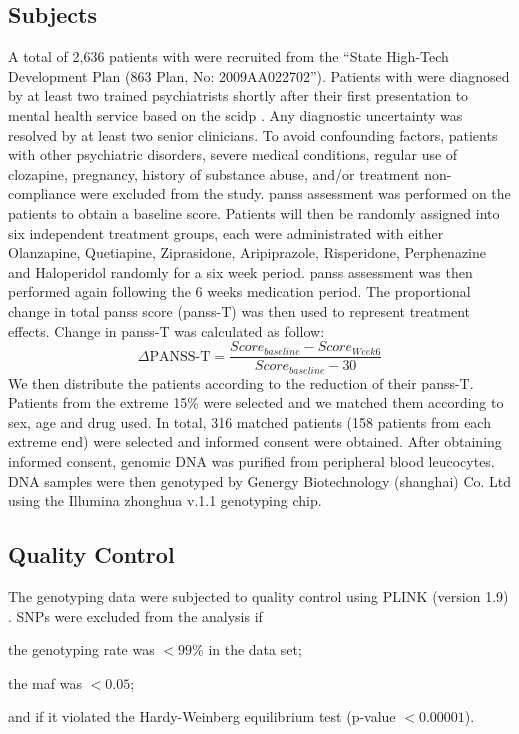 	\subsection{Subjects}
	A total of 2,636 patients with  were recruited from the ``State High-Tech Development Plan (863 Plan, No: 2009AA022702'').
	Patients with  were diagnosed by at least two trained psychiatrists shortly after their first presentation to mental health service based on the \gls{scidp} \citep{First2002}. 
	Any diagnostic uncertainty was resolved by at least two senior clinicians. 
	To avoid confounding factors, patients with other psychiatric disorders, severe medical conditions, regular use of clozapine, pregnancy, history of substance abuse, and/or treatment non-compliance were excluded from the study. 
	\gls{panss} assessment was performed on the patients to obtain a baseline score.
	Patients will then be randomly assigned into six independent treatment groups, each were administrated with either Olanzapine, Quetiapine, Ziprasidone, Aripiprazole, Risperidone, Perphenazine and Haloperidol randomly for a six week period.
	\gls{panss} assessment was then performed again following the 6 weeks medication period. 
	The proportional change in total \gls{panss} score (\gls{panss}-T) was then used to represent treatment effects.
	Change in \gls{panss}-T was calculated as follow:
	\begin{equation}
	 \Delta\text{PANSS-T}=\frac{Score_{baseline}-Score_{Week6}}{Score_{baseline}-30}
	\end{equation}
	We then distribute the patients according to the reduction of their \gls{panss}-T.
	Patients from the extreme 15\% were selected and we matched them according to sex, age and drug used. 
	In total, 316 matched patients (158 patients from each extreme end) were selected and informed consent were obtained.
	After obtaining informed consent, genomic DNA was purified from peripheral blood leucocytes. 
	DNA samples were then genotyped by Genergy Biotechnology (shanghai) Co. Ltd using the Illumina zhonghua v.1.1 genotyping chip.
	
	\subsection{Quality Control}
	The genotyping data were subjected to quality control using PLINK (version 1.9) \citep{Purcell2007}.
	\glspl{SNP} were excluded from the analysis if 
	\begin{enumerate*}[label=\roman*)]
		\item the genotyping rate was $<99\%$ in the data set;
		\item the \gls{maf} was $<0.05$;
		\item and if it violated the Hardy-Weinberg equilibrium test (p-value $< 0.00001$).
	\end{enumerate*}
	
